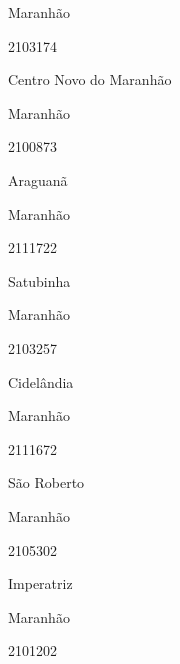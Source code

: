 \documentclass[
  letterpaper,
]{report}
\begin{document}
\n    

\n      

Maranhão

\n      

2103174

\n      

Centro Novo do Maranhão

\n    

\n    

\n      

Maranhão

\n      

2100873

\n      

Araguanã

\n    

\n    

\n      

Maranhão

\n      

2111722

\n      

Satubinha

\n    

\n    

\n      

Maranhão

\n      

2103257

\n      

Cidelândia

\n    

\n    

\n      

Maranhão

\n      

2111672

\n      

São Roberto

\n    

\n    

\n      

Maranhão

\n      

2105302

\n      

Imperatriz

\n    

\n    

\n      

Maranhão

\n      

2101202
\end{document}
